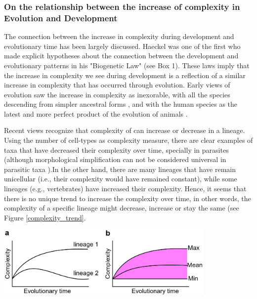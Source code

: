 %
%
\subsubsection{ On the relationship between the increase of complexity in Evolution and Development}
The connection between the increase in complexity during development and evolutionary time has been largely discussed.
Haeckel was one of the first who made explicit hypotheses about the connection between the development and evolutionary patterns in his "Biogenetic Law" (see Box 1).
%
These laws imply that the increase in complexity we see during development is a reflection of a similar increase in complexity that has occurred through evolution.
%
Early views of evolution saw the increase in complexity as inexorable, with all the species descending from simpler ancestral forms \citep{lamarck1809zoo,haeckel1874menschen}, and with the human species as the latest and more perfect product of the evolution of animals \citep{haeckel1874menschen}.


Recent views recognize that complexity of can increase or decrease in a lineage.
Using the number of cell-types as complexity measure, there are clear examples of taxa that have decreased their complexity over time, specially in parasites \citep{Canning2003,Arthur2010} (although morphological simplification can not be considered universal in parasitic taxa \citealp{poulin2011evolutionary}).In the other hand, there are many lineages that have remain unicellular (i.e., their complexity would have remained constant), while some lineages (e.g., vertebrates) have increased their complexity. Hence, it seems that there is no unique trend to increase the complexity over time, in other words, the complexity of a specific lineage might decrease, increase or stay the same (see Figure \ref{complexity_trend}.
\par
{\centering
  \includegraphics[width=0.8\textwidth]{./Images/complexity_min.jpeg}
  \centering
\label{complexity_trend}
}
\par

